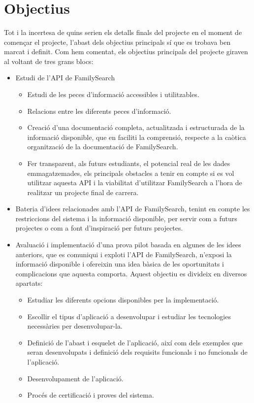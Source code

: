 \section{Objectius}

    \paragraph{}
    Tot i la incertesa de quins serien els detalls finals del projecte en el moment de començar el projecte, l’abast dels objectius principals sí que es trobava ben marcat i definit. Com hem comentat, els objectius principals del projecte giraven al voltant de tres grans blocs:

    \begin{itemize}
        \item Estudi de l’\gls{API} de FamilySearch
        \begin{itemize}
            \item Estudi de les peces d’informació accessibles i utilitzables.
            \item Relacions entre les diferents peces d’informació.
            \item Creació d'una documentació completa, actualitzada i estructurada de la informació disponible, que en faciliti la comprensió, respecte a la caòtica organització de la documentació de FamilySearch.
            \item Fer transparent, als futurs estudiants, el potencial real de les dades emmagatzemades, els principals obstacles a tenir en compte si es vol utilitzar aquesta API i la viabilitat d’utilitzar FamilySearch a l’hora de realitzar un projecte final de carrera.
        \end{itemize}
        \item Bateria d'idees relacionades amb l’\gls{API} de FamilySearch, tenint en compte les restriccions del sistema i la informació disponible, per servir com a futurs projectes o com a font d'inspiració per futurs projectes.
        \item Avaluació i implementació d'una prova pilot basada en algunes de les idees anteriors, que es comuniqui i exploti l’\gls{API} de FamilySearch, n’exposi la informació disponible i ofereixin una idea bàsica de les oportunitats i complicacions que aquesta comporta. Aquest objectiu es divideix en diversos apartats:
        \begin{itemize}
            \item Estudiar les diferents opcions disponibles per la implementació.
            \item Escollir el tipus d’aplicació a desenvolupar i estudiar les tecnologies nece\-ssà\-ries per desenvolupar-la.
            \item Definició de l’abast i esquelet de l’aplicació, així com dels exemples que seran desenvolupats i definició dels requisits funcionals i no funcionals de l'aplicació.
            \item Desenvolupament de l’aplicació.
            \item Procés de certificació i proves del sistema.
        \end{itemize}
    \end{itemize}

